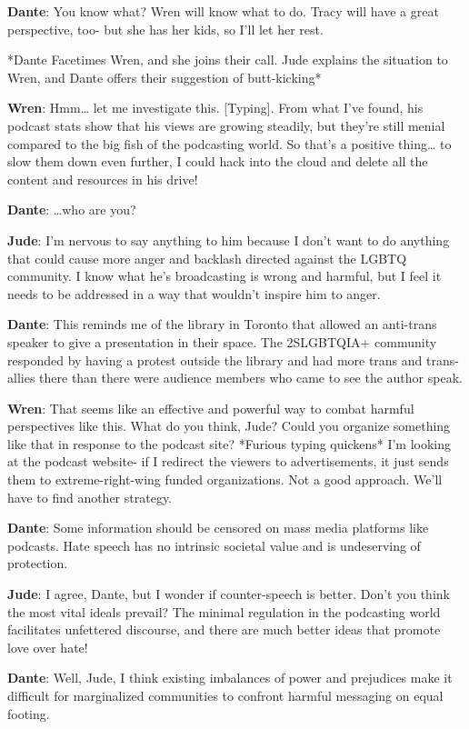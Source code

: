 \documentclass[
  letterpaper,
  DIV=11,
  numbers=noendperiod]{scrreprt}
\begin{document}
\textbf{Dante}: You know what? Wren will know what to do. Tracy will
have a great perspective, too- but she has her kids, so I'll let her
rest.

*Dante Facetimes Wren, and she joins their call. Jude explains the
situation to Wren, and Dante offers their suggestion of butt-kicking*

\textbf{Wren}: Hmm\ldots{} let me investigate this. {[}Typing{]}. From
what I've found, his podcast stats show that his views are growing
steadily, but they're still menial compared to the big fish of the
podcasting world. So that's a positive thing\ldots{} to slow them down
even further, I could hack into the cloud and delete all the content and
resources in his drive!

\textbf{Dante}: \ldots who are you?

\textbf{Jude}: I'm nervous to say anything to him because I don't want
to do anything that could cause more anger and backlash directed against
the LGBTQ community. I know what he's broadcasting is wrong and harmful,
but I feel it needs to be addressed in a way that wouldn't inspire him
to anger.

\textbf{Dante}: This reminds me of the library in Toronto that allowed
an anti-trans speaker to give a presentation in their space. The
2SLGBTQIA+ community responded by having a protest outside the library
and had more trans and trans-allies there than there were audience
members who came to see the author speak.

\textbf{Wren}: That seems like an effective and powerful way to combat
harmful perspectives like this. What do you think, Jude? Could you
organize something like that in response to the podcast site? *Furious
typing quickens* I'm looking at the podcast website- if I redirect the
viewers to advertisements, it just sends them to extreme-right-wing
funded organizations. Not a good approach. We'll have to find another
strategy.

\textbf{Dante}: Some information should be censored on mass media
platforms like podcasts. Hate speech has no intrinsic societal value and
is undeserving of protection.

\textbf{Jude}: I agree, Dante, but I wonder if counter-speech is better.
Don't you think the most vital ideals prevail? The minimal regulation in
the podcasting world facilitates unfettered discourse, and there are
much better ideas that promote love over hate!

\textbf{Dante}: Well, Jude, I think existing imbalances of power and
prejudices make it difficult for marginalized communities to confront
harmful messaging on equal footing.
\end{document}
